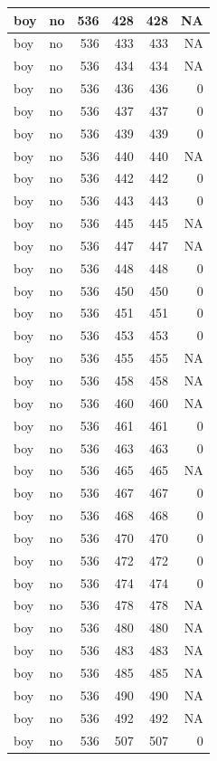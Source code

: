 \documentclass[man]{apa6}
\begin{document}
\begin{tabular}{l|l|r|r|r|r}
\hline
boy & no & 536 & 428 & 428 & NA\\
\hline
boy & no & 536 & 433 & 433 & NA\\
\hline
boy & no & 536 & 434 & 434 & NA\\
\hline
boy & no & 536 & 436 & 436 & 0\\
\hline
boy & no & 536 & 437 & 437 & 0\\
\hline
boy & no & 536 & 439 & 439 & 0\\
\hline
boy & no & 536 & 440 & 440 & NA\\
\hline
boy & no & 536 & 442 & 442 & 0\\
\hline
boy & no & 536 & 443 & 443 & 0\\
\hline
boy & no & 536 & 445 & 445 & NA\\
\hline
boy & no & 536 & 447 & 447 & NA\\
\hline
boy & no & 536 & 448 & 448 & 0\\
\hline
boy & no & 536 & 450 & 450 & 0\\
\hline
boy & no & 536 & 451 & 451 & 0\\
\hline
boy & no & 536 & 453 & 453 & 0\\
\hline
boy & no & 536 & 455 & 455 & NA\\
\hline
boy & no & 536 & 458 & 458 & NA\\
\hline
boy & no & 536 & 460 & 460 & NA\\
\hline
boy & no & 536 & 461 & 461 & 0\\
\hline
boy & no & 536 & 463 & 463 & 0\\
\hline
boy & no & 536 & 465 & 465 & NA\\
\hline
boy & no & 536 & 467 & 467 & 0\\
\hline
boy & no & 536 & 468 & 468 & 0\\
\hline
boy & no & 536 & 470 & 470 & 0\\
\hline
boy & no & 536 & 472 & 472 & 0\\
\hline
boy & no & 536 & 474 & 474 & 0\\
\hline
boy & no & 536 & 478 & 478 & NA\\
\hline
boy & no & 536 & 480 & 480 & NA\\
\hline
boy & no & 536 & 483 & 483 & NA\\
\hline
boy & no & 536 & 485 & 485 & NA\\
\hline
boy & no & 536 & 490 & 490 & NA\\
\hline
boy & no & 536 & 492 & 492 & NA\\
\hline
boy & no & 536 & 507 & 507 & 0\\

\end{tabular}
\end{document}
